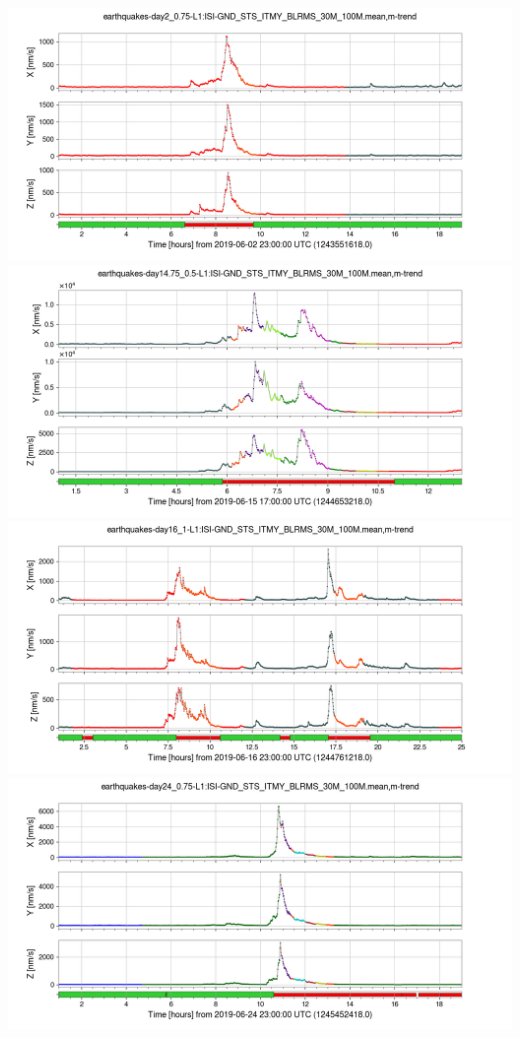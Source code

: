 \documentclass[colorlinks=true,pdfstartview=FitV,linkcolor=blue,
            citecolor=red,urlcolor=magenta]{ligodoc}
\begin{document}
\rightfigures
{
  \includegraphics[width=\textwidth]{assets/report1/earthquakes-day2_075-L1:ISI-GND_STS_ITMY_BLRMS_30M_100Mmean,m-trend.png}\\
  \includegraphics[width=\textwidth]{assets/report1/earthquakes-day1475_05-L1:ISI-GND_STS_ITMY_BLRMS_30M_100Mmean,m-trend.png}\\
  \includegraphics[width=\textwidth]{assets/report1/earthquakes-day16_1-L1:ISI-GND_STS_ITMY_BLRMS_30M_100Mmean,m-trend.png}\\
  \includegraphics[width=\textwidth]{assets/report1/earthquakes-day24_075-L1:ISI-GND_STS_ITMY_BLRMS_30M_100Mmean,m-trend.png}
}
\end{document}

